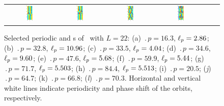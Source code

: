 \begin{figure}[t]
\begin{center}
\begin{tabular}{cccccc}
\includegraphics[width=0.15\textwidth]{figs/ks22rpo059.9-05.44.eps}\hspace{-3ex} &
\includegraphics[width=0.15\textwidth]{figs/ks22rpo084.4-05.51.eps}\hspace{-3ex} &
\includegraphics[width=0.15\textwidth]{figs/ks22rpo064.7-00.00.eps}\hspace{-3ex} &
\includegraphics[width=0.15\textwidth]{figs/ks22rpo070.3-00.00.eps}
\end{tabular}
\end{center}
\caption{Selected periodic and \rpo s of \KSe\ with $L = 22$:
(a) $\period{p} = 16.3$, $\ell_p = 2.86$;
(b) $\period{p} = 32.8$, $\ell_p = 10.96$;
(c) $\period{p} = 33.5$, $\ell_p = 4.04$;
(d) $\period{p} = 34.6$, $\ell_p = 9.60$;
(e) $\period{p} = 47.6$, $\ell_p = 5.68$;
(f) $\period{p} = 59.9$, $\ell_p = 5.44$;
(g) $\period{p} = 71.7$, $\ell_p = 5.503$;
(h) $\period{p} = 84.4$, $\ell_p = 5.513$;
(i) $\period{p} = 20.5$;  (\textit{j}) $\period{p} = 64.7$;
(k) $\period{p} = 66.8$;  (\textit{l}) $\period{p} = 70.3$.
Horizontal and vertical white lines indicate periodicity and phase
shift of the orbits, respectively.
}\label{f:ks22rpos}
\end{figure}
